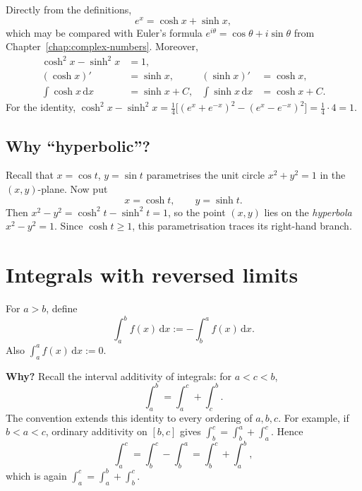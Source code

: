 Directly from the definitions,
\[
 e^x=\cosh x+\sinh x,
\]
which may be compared with Euler's formula $e^{i\theta}=\cos\theta+i\sin\theta$
from Chapter~\ref{chap:complex-numbers}. Moreover,
\begin{align*}
 \cosh^2x-\sinh^2x&=1,\\
 (\cosh x)'&=\sinh x, & (\sinh x)'&=\cosh x,\\
 \int\cosh x\,\mathrm dx&=\sinh x+C, & \int\sinh x\,\mathrm dx&=\cosh x+C.
\end{align*}
For the identity, $\cosh^2x-\sinh^2x=\frac14\bigl[(e^x+e^{-x})^2-(e^x-e^{-x})^2\bigr]
=\frac14\cdot4=1$.

\subsection{Why ``hyperbolic''?}
Recall that $x=\cos t$, $y=\sin t$ parametrises the unit circle
$x^2+y^2=1$ in the $(x,y)$-plane. Now put
\[
 x=\cosh t,\qquad y=\sinh t.
\]
Then $x^2-y^2=\cosh^2t-\sinh^2t=1$, so the point $(x,y)$ lies on the
\emph{hyperbola} $x^2-y^2=1$. Since $\cosh t\ge1$, this parametrisation traces
its right-hand branch.

\begin{center}
\end{center}

\section{Integrals with reversed limits}

\begin{definition}[Convention]
For $a>b$, define
\[
 \int_a^b f(x)\,\mathrm dx:=-\int_b^a f(x)\,\mathrm dx.
\]
Also $\int_a^a f(x)\,\mathrm dx:=0$.
\end{definition}

\textbf{Why?} Recall the interval additivity of integrals: for $a<c<b$,
\[
 \int_a^b=\int_a^c+\int_c^b.
\]
The convention extends this identity to every ordering of $a,b,c$.
For example, if $b<a<c$, ordinary additivity on $[b,c]$ gives
$\int_b^c=\int_b^a+\int_a^c$. Hence
\[
 \int_a^c=\int_b^c-\int_b^a=\int_b^c+\int_a^b,
\]
which is again $\int_a^c=\int_a^b+\int_b^c$.

